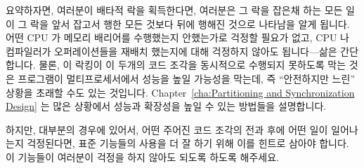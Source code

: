 요약하자면, 여러분이 배타적 락을 획득한다면, 여러분은 그 락을 잡은채 하는 모든
일이 그 락을 앞서 잡고서 행한 모든 것보다 뒤에 행해진 것으로 나타남을 알게
됩니다.
어떤 CPU 가 메모리 배리어를 수행했는지 안했는가로 걱정할 필요가 없고, CPU 나
컴파일러가 오퍼레이션들을 재배치 했는지에 대해 걱정하지 않아도 됩니다---삶은
간단합니다.
물론, 이 락킹이 이 두개의 코드 조각을 동시적으로 수행되지 못하도록 막는 것은
프로그램이 멀티프로세서에서 성능을 높일 가능성을 막는데, 즉 ``안전하지만 느린''
상황을 초래할 수도 있는 것입니다.
Chapter~\ref{cha:Partitioning and Synchronization Design} 는 많은 상황에서
성능과 확장성을 높일 수 있는 방법들을 설명합니다.

하지만, 대부분의 경우에 있어서, 어떤 주어진 코드 조각의 전과 후에 어떤 일이
일어나는지 걱정된다면, 표준 기능들의 사용을 더 잘 하기 위해 이를 힌트로 삼아야
합니다.
이 기능들이 여러분이 걱정을 하지 않아도 되도록 하도록 해주세요.
\iffalse

In summary, if you acquire an exclusive lock, you {\em know} that
anything you do while holding that lock will appear to happen after
anything done by any prior holder of that lock.
No need to worry about which CPU did or did not execute a memory
barrier, no need to worry about the CPU or compiler reordering
operations---life is simple.
Of course, the fact that this locking prevents these two pieces of
code from running concurrently might limit the program's ability
to gain increased performance on multiprocessors, possibly resulting
in a ``safe but slow'' situation.
Chapter~\ref{cha:Partitioning and Synchronization Design} describes ways of
gaining performance and scalability in many situations.

However, in most cases, if you find yourself worrying about what happens
before or after a given piece of code, you should take this as a hint to
make better use of the standard primitives.
Let these primitives do the worrying for you.
\fi
